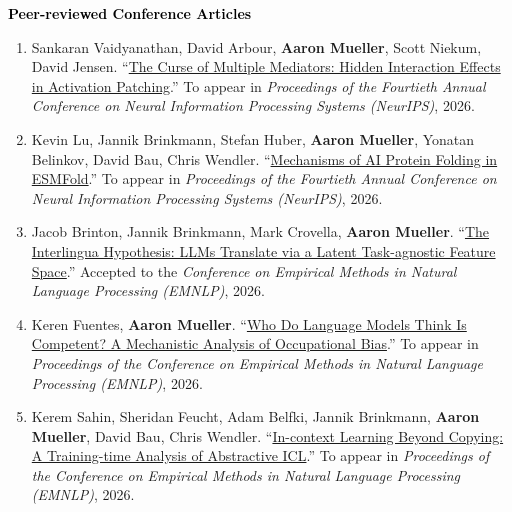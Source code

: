 \documentclass[10pt]{article}
\renewcommand{\section}[1]{\pagebreak[3]%
	\vspace{0.5\baselineskip}%
	\phantomsection\addcontentsline{toc}{section}{#1}%
	\noindent\llap{\bf\scshape\smash{\parbox[t]{\marginparwidth}{\hyphenpenalty=10000\raggedright \textcolor{black}{#1}}}}%
	\vspace{-\baselineskip}\par}
\renewcommand{\subsection}[1]{\textcolor{black}{#1}}
\providecommand*\titlelink[2]{\href{#1}{\textcolor{accent}{#2}}}
\begin{document}
	\section{Publications}

	\subsection{\textbf{Peer-reviewed Conference Articles}}
	\begin{enumerate}[leftmargin=*, topsep=0pt, itemsep=0.25ex, partopsep=0ex, parsep=1ex, label=C\arabic*., ref=C\arabic*]

	\item Sankaran Vaidyanathan, David Arbour, \textbf{Aaron Mueller}, Scott Niekum, David Jensen. ``\titlelink{https://arxiv.org/abs/2606.27510}{The Curse of Multiple Mediators: Hidden Interaction Effects in Activation Patching}.'' To appear in \emph{Proceedings of the Fourtieth Annual Conference on Neural Information Processing Systems (NeurIPS)}, 2026.
		
	\item Kevin Lu, Jannik Brinkmann, Stefan Huber, \textbf{Aaron Mueller}, Yonatan Belinkov, David Bau, Chris Wendler. ``\titlelink{https://arxiv.org/abs/2602.06020}{Mechanisms of AI Protein Folding in ESMFold}.'' To appear in \emph{Proceedings of the Fourtieth Annual Conference on Neural Information Processing Systems (NeurIPS)}, 2026.
	
	\item Jacob Brinton, Jannik Brinkmann, Mark Crovella, \textbf{Aaron Mueller}. ``\titlelink{https://arxiv.org/abs/2609.00515}{The Interlingua Hypothesis: LLMs Translate via a Latent Task-agnostic Feature Space}.'' Accepted to the \emph{Conference on Empirical Methods in Natural Language Processing (EMNLP)}, 2026.
	
	\item Keren Fuentes, \textbf{Aaron Mueller}. ``\titlelink{https://arxiv.org/abs/2608.20347}{Who Do Language Models Think Is Competent? A Mechanistic Analysis of Occupational Bias}.'' To appear in \emph{Proceedings of the Conference on Empirical Methods in Natural Language Processing (EMNLP)}, 2026.
	
	\item Kerem Sahin, Sheridan Feucht, Adam Belfki, Jannik Brinkmann, \textbf{Aaron Mueller}, David Bau, Chris Wendler. ``\titlelink{https://arxiv.org/abs/2511.05743}{In-context Learning Beyond Copying: A Training-time Analysis of Abstractive ICL}.'' To appear in \emph{Proceedings of the Conference on Empirical Methods in Natural Language Processing (EMNLP)}, 2026.


\end{enumerate}
\end{document}
